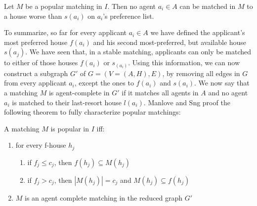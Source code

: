\newtheorem{lemma-popular-3}[theorem]{Lemma}
\begin{lemma}\label{lemma-popular3}
    Let $M$ be a popular matching in $I$. Then no agent $a_i \in A$ can be matched in $M$ to a house worse than $s(a_i)$ on $a_i$'s preference list.
\end{lemma} 

To summarize, so far for every applicant $a_i \in A$ we have defined the applicant's most preferred house $f(a_i)$ and his second most-preferred, but available house $s(a_j)$. We have seen that, in a stable matching, applicants can only be matched to either of those houses $f(a_i)$ or $s_(a_i)$. Using this information, we can now construct a subgraph $G'$ of $G = (V=(A, H), E)$, by removing all edges in $G$ from every applicant $a_i$, except the ones to $f(a_i)$ and $s(a_i)$. We now say that a matching $M$ is agent-complete in $G'$ if it matches all agents in $A$ and no agent $a_i$ is matched to their last-resort house $l(a_i)$.\cite{ManlovePopularMatchings} Manlove and Sng proof the following theorem to fully characterize popular matchings\cite{ManlovePopularMatchings}:
\newtheorem{theorem-popular-4}[theorem]{Theorem}
\begin{theorem}\label{theorem-popular-4}
    A matching $M$ is popular in $I$ iff:
    \begin{enumerate}
        \item for every f-house $h_j$
        \begin{enumerate}
            \item\label{condition1a} if $f_j \leq c_j$, then $f(h_j) \subseteq M(h_j)$
            \item\label{condition1b} if $f_j > c_j$, then $|M(h_j)| = c_j$ and $M(h_j) \subseteq f(h_j)$
        \end{enumerate}
        \item $M$ is an agent complete matching in the reduced graph $G'$
    \end{enumerate}
\end{theorem} 

